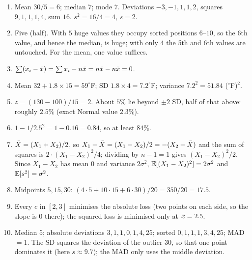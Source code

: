 \begin{enumerate}
  \item Mean $30/5 = 6$; median $7$; mode $7$. Deviations $-3,-1,1,1,2$, squares
  $9,1,1,1,4$, sum $16$. $s^2 = 16/4 = 4$, $s = 2$.
  \item Five (half). With $5$ huge values they occupy sorted positions $6$--$10$, so
  the 6th value, and hence the median, is huge; with only $4$ the 5th and 6th values
  are untouched. For the mean, one value suffices.
  \item $\sum(x_i - \bar{x}) = \sum x_i - n\bar{x} = n\bar{x} - n\bar{x} = 0$.
  \item Mean $32 + 1.8 \times 15 = 59^\circ$F; SD $1.8 \times 4 = 7.2^\circ$F;
  variance $7.2^2 = 51.84$ ($^\circ$F)$^2$.
  \item $z = (130-100)/15 = 2$. About $5\%$ lie beyond $\pm 2$ SD, half of that above:
  roughly $2.5\%$ (exact Normal value $2.3\%$).
  \item $1 - 1/2.5^2 = 1 - 0.16 = 0.84$, so at least $84\%$.
  \item $\bar{X} = (X_1+X_2)/2$, so $X_1 - \bar{X} = (X_1-X_2)/2 = -(X_2-\bar{X})$ and the
  sum of squares is $2\cdot (X_1-X_2)^2/4$; dividing by $n-1 = 1$ gives
  $(X_1-X_2)^2/2$. Since $X_1 - X_2$ has mean $0$ and variance $2\sigma^2$,
  $\operatorname{\mathbb{E}}[(X_1-X_2)^2] = 2\sigma^2$ and $\operatorname{\mathbb{E}}[s^2] = \sigma^2$.
  \item Midpoints $5, 15, 30$: $(4\cdot 5 + 10\cdot 15 + 6 \cdot 30)/20 = 350/20 = 17.5$.
  \item Every $c$ in $[2, 3]$ minimises the absolute loss (two points on each side,
  so the slope is $0$ there); the squared loss is minimised only at $\bar{x} = 2.5$.
  \item Median $5$; absolute deviations $3,1,1,0,1,4,25$; sorted $0,1,1,1,3,4,25$;
  MAD $= 1$. The SD squares the deviation of the outlier $30$, so that one point
  dominates it (here $s \approx 9.7$); the MAD only uses the middle deviation.
\end{enumerate}
